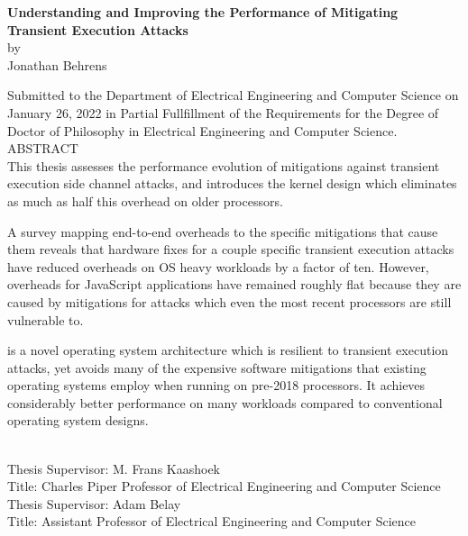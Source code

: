 
\singlespace
\begin{center}

{\large \bf Understanding and Improving the Performance of Mitigating Transient Execution Attacks} \\[.5\baselineskip]
by \\
Jonathan Behrens \\[.5\baselineskip]
\end{center}

Submitted to the Department of Electrical Engineering and Computer Science on January 26, 2022 in Partial Fullfillment of the Requirements for the Degree of Doctor of Philosophy in Electrical Engineering and Computer Science.\\[.5\baselineskip]

\noindent
ABSTRACT \\

This thesis assesses the performance evolution of mitigations against transient execution side channel attacks, and introduces the \sys kernel design which eliminates as much as half this overhead on older processors.

A survey mapping end-to-end overheads to the specific mitigations that cause them reveals that hardware fixes for a couple specific transient execution attacks have reduced overheads on OS heavy workloads by a factor of ten.
However, overheads for JavaScript applications have remained roughly flat because they are caused by mitigations for attacks which even the most recent processors are still vulnerable to.


\sys is a novel operating system architecture which is resilient to transient execution attacks, yet avoids many of the expensive software mitigations that existing operating systems employ when running on pre-2018 processors. 
It achieves considerably better performance on many workloads compared to conventional operating system designs.

~\\[\baselineskip]

\noindent
Thesis  Supervisor:  M.  Frans  Kaashoek \\
Title:  Charles  Piper  Professor  of Electrical  Engineering  and  Computer  Science \\[.5\baselineskip]
\noindent
Thesis  Supervisor:  Adam Belay \\
Title:  Assistant Professor  of Electrical  Engineering  and  Computer  Science \\

\doublespace